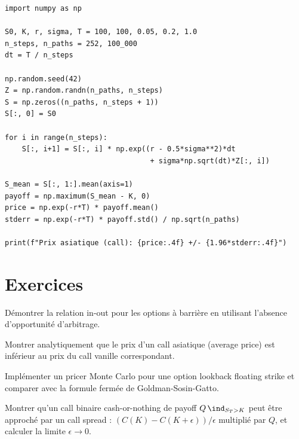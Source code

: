 \begin{codeblock}[title=\textbf{Prix d'une option asiatique par Monte Carlo}]
\begin{verbatim}
import numpy as np

S0, K, r, sigma, T = 100, 100, 0.05, 0.2, 1.0
n_steps, n_paths = 252, 100_000
dt = T / n_steps

np.random.seed(42)
Z = np.random.randn(n_paths, n_steps)
S = np.zeros((n_paths, n_steps + 1))
S[:, 0] = S0

for i in range(n_steps):
    S[:, i+1] = S[:, i] * np.exp((r - 0.5*sigma**2)*dt
                                  + sigma*np.sqrt(dt)*Z[:, i])

S_mean = S[:, 1:].mean(axis=1)
payoff = np.maximum(S_mean - K, 0)
price = np.exp(-r*T) * payoff.mean()
stderr = np.exp(-r*T) * payoff.std() / np.sqrt(n_paths)

print(f"Prix asiatique (call): {price:.4f} +/- {1.96*stderr:.4f}")
\end{verbatim}
\end{codeblock}

\section{Exercices}

\begin{exercice}
D\'emontrer la relation in-out pour les options \`a barri\`ere en utilisant
l'absence d'opportunit\'e d'arbitrage.
\end{exercice}

\begin{exercice}
Montrer analytiquement que le prix d'un call asiatique (average price) est
inf\'erieur au prix du call vanille correspondant.
\end{exercice}

\begin{exercice}
Impl\'ementer un pricer Monte Carlo pour une option lookback floating strike
et comparer avec la formule ferm\'ee de Goldman-Sosin-Gatto.
\end{exercice}

\begin{exercice}
Montrer qu'un call binaire cash-or-nothing de payoff $Q\,\ind_{S_T > K}$ peut
\^etre approch\'e par un call spread : $(C(K) - C(K + \epsilon))/\epsilon$
multipli\'e par $Q$, et calculer la limite $\epsilon \to 0$.
\end{exercice}

